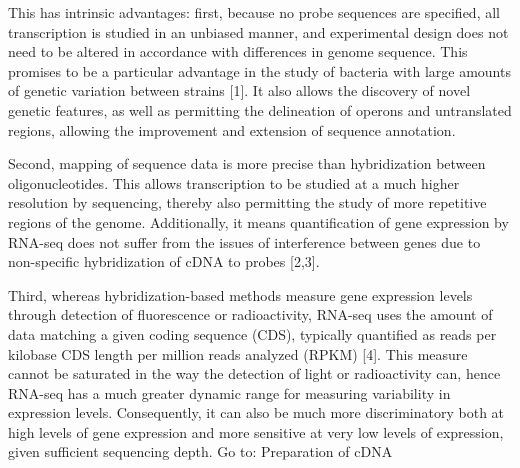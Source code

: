 \documentclass[a4paper]{thesis}
\begin{document}
This has intrinsic advantages: first, because no probe sequences are specified, all transcription is studied in an unbiased manner, and experimental design does not need to be altered in accordance with differences in genome sequence. This promises to be a particular advantage in the study of bacteria with large amounts of genetic variation between strains [1]. It also allows the discovery of novel genetic features, as well as permitting the delineation of operons and untranslated regions, allowing the improvement and extension of sequence annotation.











Second, mapping of sequence data is more precise than hybridization between oligonucleotides. This allows transcription to be studied at a much higher resolution by sequencing, thereby also permitting the study of more repetitive regions of the genome. Additionally, it means quantification of gene expression by RNA-seq does not suffer from the issues of interference between genes due to non-specific hybridization of cDNA to probes [2,3].

Third, whereas hybridization-based methods measure gene expression levels through detection of fluorescence or radioactivity, RNA-seq uses the amount of data matching a given coding sequence (CDS), typically quantified as reads per kilobase CDS length per million reads analyzed (RPKM) [4]. This measure cannot be saturated in the way the detection of light or radioactivity can, hence RNA-seq has a much greater dynamic range for measuring variability in expression levels. Consequently, it can also be much more discriminatory both at high levels of gene expression and more sensitive at very low levels of expression, given sufficient sequencing depth.
Go to:
Preparation of cDNA
\end{document}
